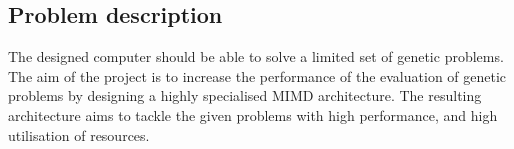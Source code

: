 \subsection{Problem description}
The designed computer should be able to solve a limited set of genetic problems. The aim of the project is to increase the performance of the evaluation of genetic problems by designing a highly specialised MIMD architecture. The resulting architecture aims to tackle the given problems with high performance, and high utilisation of resources.  

